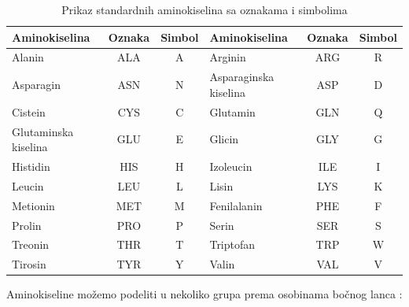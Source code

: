\begin{table}
	\centering
	\begin{tabular}{|lcc|lcc|}
		\hline
		Aminokiselina & Oznaka & Simbol & Aminokiselina & Oznaka & Simbol \\
		\hline
		Alanin & ALA & A & Arginin & ARG & R  \\
		Asparagin & ASN & N & Asparaginska kiselina & ASP & D \\
		Cistein & CYS & C & Glutamin & GLN & Q  \\
		Glutaminska kiselina & GLU & E & Glicin & GLY & G  \\
		Histidin & HIS & H & Izoleucin & ILE & I  \\
		Leucin & LEU & L & Lisin & LYS & K  \\
		Metionin & MET & M & Fenilalanin & PHE & F  \\
		Prolin & PRO & P & Serin & SER & S  \\
		Treonin & THR & T & Triptofan & TRP & W  \\
		Tirosin & TYR & Y & Valin & VAL & V \\
		\hline             
	\end{tabular}
	\caption{Prikaz standardnih aminokiselina sa oznakama i simbolima}
	\label{tab: aminoacids}
\end{table}

\newpage
\noindent Aminokiseline možemo podeliti u nekoliko grupa prema osobinama bočnog lanca \cite{biochemestry5, biohUdz, bioinf}:

